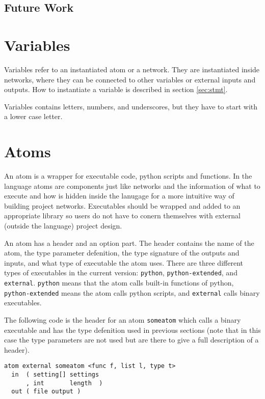 \subsection{Future Work}


\section{Variables}
Variables refer to an instantiated atom or a network. They are
instantiated inside networks, where they can be connected to other
variables or external inputs and outputs. How to instantiate a
variable is described in section \autoref{sec:stmt}.

Variables contains letters, numbers, and underscores, but they have to
start with a lower case letter.

\section{Atoms}\label{sec:atom}
An atom is a wrapper for executable code, python scripts and
functions. In the language atoms are components just like networks and
the information of what to execute and how is hidden inside the
lanugage for a more intuitive way of building project
networks. Executables should be wrapped and added to an appropriate
library so users do not have to conern themselves with external
(outside the language) project design.

An atom has a header and an option part. The header contains the name
of the atom, the type parameter defenition, the type signature of the
outputs and inputs, and what type of executable the atom uses. There
are three different types of executables in the current version:
\verb#python#, \verb#python-extended#, and
\verb#external#. \verb#python# means that the atom calls built-in
functions of python, \verb#python-extended# means the atom calls
python scripts, and \verb#external# calls binary executables.

The following code is the header for an atom \verb#someatom# which
calls a binary executable and has the type defenition used in previous
sections (note that in this case the type parameters are not used but
are there to give a full description of a header).

\begin{verbatim}
atom external someatom <func f, list l, type t>
  in  ( setting[] settings
      , int       length  )
  out ( file output )
\end{verbatim}

